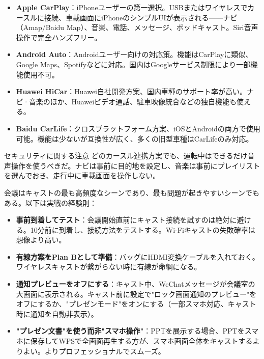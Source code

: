 \begin{itemize}
  \item \textbf{Apple CarPlay}：iPhoneユーザーの第一選択。USBまたはワイヤレスでカースルに接続、車載画面にiPhoneのシンプルUIが表示される——ナビ（Amap/Baidu Map）、音楽、電話、メッセージ、ポッドキャスト。Siri音声操作で完全ハンズフリー。
  \item \textbf{Android Auto}：Androidユーザー向けの対応策。機能はCarPlayに類似、Google Maps、Spotifyなどに対応。国内はGoogleサービス制限により一部機能使用不可。
  \item \textbf{Huawei HiCar}：Huawei自社開発方案、国内車種のサポート率が高い。ナビ·音楽のほか、Huaweiビデオ通話、駐車映像統合などの独自機能も使える。
  \item \textbf{Baidu CarLife}：クロスプラットフォーム方案、iOSとAndroidの両方で使用可能。機能は少ないが互換性が広く、多くの旧型車種はCarLifeのみ対応。
\end{itemize}

\begin{tcbwarn}{セキュリティに関する注意}
どのカースル連携方案でも、運転中はできるだけ音声操作を使うべきだ。ナビは事前に目的地を設定し、音楽は事前にプレイリストを選んでおき、走行中に車載画面を操作しない。

\end{tcbwarn}


会議はキャストの最も高頻度なシーンであり、最も問題が起きやすいシーンでもある。以下は実戦の経験則：

\begin{itemize}
  \item \textbf{事前到着してテスト}：会議開始直前にキャスト接続を試すのは絶対に避ける。10分前に到着し、接続方法をテストする。Wi-Fiキャストの失敗確率は想像より高い。
  \item \textbf{有線方案をPlan Bとして準備}：バッグにHDMI変換ケーブルを入れておく。ワイヤレスキャストが繋がらない時に有線が命綱になる。
  \item \textbf{通知プレビューをオフにする}：キャスト中、WeChatメッセージが会議室の大画面に表示される。キャスト前に設定で"ロック画面通知のプレビュー"をオフにするか、"プレゼンモード"をオンにする（一部スマホ対応、キャスト時に通知を自動非表示）。
  \item \textbf{"プレゼン文書"を使う而非"スマホ操作"}：PPTを展示する場合、PPTをスマホに保存してWPSで全画面再生する方が、スマホ画面全体をキャストするよりよい。よりプロフェッショナルでスムーズ。
\end{itemize}

